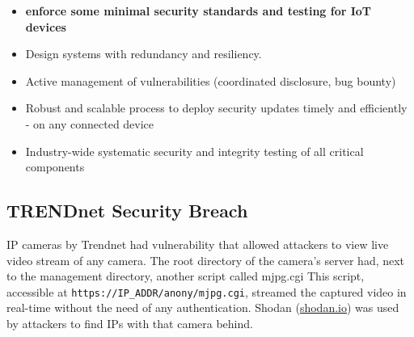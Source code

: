 \documentclass[11pt,oneside,a4paper]{article}
\begin{document}
\vspace{-\topsep}
\begin{itemize}
	\setlength{\itemsep}{0pt}
	\setlength{\parskip}{0pt}
	\item \textbf{enforce some minimal security standards and testing for IoT devices}
	\item Design systems with redundancy and resiliency.
	\item Active management of vulnerabilities (coordinated disclosure, bug bounty)
	\item Robust and scalable process to deploy security updates timely and efficiently - on any connected device
	\item Industry-wide systematic security and integrity testing of all critical components
\end{itemize}
\vspace{-\topsep}

\newpage

\subsection{TRENDnet Security Breach}

IP cameras by Trendnet had vulnerability that allowed attackers to view live video stream of any camera. The root directory of the camera’s server had, next to the management directory, another script called mjpg.cgi This script, accessible at \texttt{https://IP\_ADDR/anony/mjpg.cgi}, streamed the captured video in real-time without the need of any authentication. Shodan (\href{https://www.shodan.io/}{shodan.io}) was used by attackers to find IPs with that camera behind.





\label{lastpage} %
\clearpage
{}



\clearpage
\appendix
{}
\end{document}

